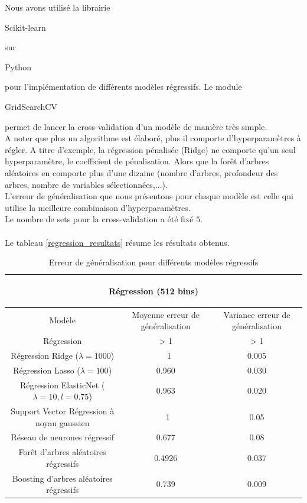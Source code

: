 \documentclass{book}
\begin{document}
Nous avons utilisé la librairie \begin{itshape}Scikit-learn\end{itshape}\cite{scikit-learn} sur \begin{itshape}Python\end{itshape} 
pour l'implémentation de différents modèles régressifs. Le module \begin{itshape}GridSearchCV\end{itshape} permet de lancer
la cross-validation d'un modèle de manière très simple.\\
A noter que plus un algorithme est élaboré, plus il comporte d'hyperparamètres à régler. A titre d'exemple, la régression pénalisée (Ridge)
ne comporte qu'un seul hyperparamètre, le coefficient de pénalisation. Alors que la for\^{e}t d'arbres aléatoires en comporte plus d'une dizaine
(nombre d'arbres, profondeur des arbres, nombre de variables sélectionnées,...).\\
L'erreur de généralisation que nous présentons pour chaque modèle 
est celle qui utilise la meilleure combinaison d'hyperparamètres.\\
Le nombre de sets pour la cross-validation a été fixé $5$.\\
\\
Le tableau \ref{regression_resultats} résume les résultats obtenus.
\begin{table}[H]
\begin{center}
\begin{adjustbox}{max width=\textwidth}
\begin{tabular}{|c|c|c|}
\hline
\multicolumn{3}{|c|}{\begin{bf}Régression (512 bins)\end{bf}} \\
\hline 
Modèle & Moyenne erreur de généralisation & Variance erreur de généralisation\\
\hline 
Régression & > 1 & > 1\\
\hline 
Régression Ridge ($\lambda=1000$) & ~ 1 & 0.005\\
\hline 
Régression Lasso ($\lambda=100$) & 0.960 & 0.030\\
\hline 
Régression ElasticNet ($\lambda=10,l=0.75$) & 0.963 & 0.020\\
\hline
Support Vector Régression à noyau gaussien & ~1 & 0.05\\
\hline
Réseau de neurones régressif & 0.677 & 0.08\\
\hline
For\^{e}t d'arbres aléatoires régressifs & 0.4926 & 0.037\\
\hline
Boosting d'arbres aléatoires régressifs & 0.739 & 0.009\\
\hline
\end{tabular}
\end{adjustbox}
\end{center}
\caption{Erreur de généralisation pour différents modèles régressifs}
\label{regression_resultats_512}
\end{table}
\end{document}
